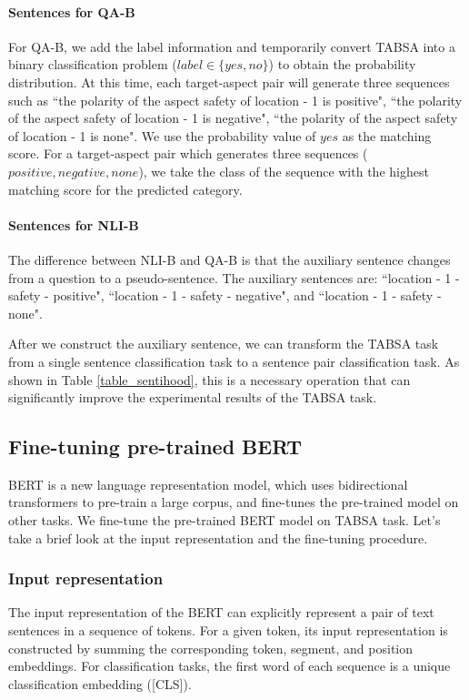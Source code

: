 \documentclass[11pt,a4paper]{article}
\theoremstyle{definition}
\begin{document}
	\paragraph{Sentences for QA-B}
	For QA-B, we add the label information and temporarily convert TABSA into a binary classification problem ($label\in\{yes, no\} $) to obtain the probability distribution. At this time, each target-aspect pair will generate three sequences such as ``the polarity of the aspect safety of location - 1 is positive", ``the polarity of the aspect safety of location - 1 is negative", ``the polarity of the aspect safety of location - 1 is none". We use the probability value of $yes$ as the matching score. For a target-aspect pair which generates three sequences ($positive, negative, none$), we take the class of the sequence with the highest matching score for the predicted category.
	
	\paragraph{Sentences for NLI-B}
	The difference between NLI-B and QA-B is that the auxiliary sentence changes from a question to a pseudo-sentence. The auxiliary sentences are: ``location - 1 - safety - positive", ``location - 1 - safety - negative", and ``location - 1 - safety - none".
	
	After we construct the auxiliary sentence, we can transform the TABSA task from a single sentence classification task to a sentence pair classification task. As shown in Table \ref{table_sentihood}, this is a necessary operation that can significantly improve the experimental results of the TABSA task.
	
	\subsection{Fine-tuning pre-trained BERT}
	BERT \cite{devlin2018bert} is a new language representation model, which uses bidirectional transformers to pre-train a large corpus, and fine-tunes the pre-trained model on other tasks. We fine-tune the pre-trained BERT model on TABSA task. Let's take a brief look at the input representation and the fine-tuning procedure.
	
	\subsubsection{Input representation} The input representation of the BERT can explicitly represent a pair of text sentences in a sequence of tokens. For a given token, its input representation is constructed by summing the corresponding token, segment, and position embeddings. For classification tasks, the first word of each sequence is a unique classification embedding ([CLS]).
	
\end{document}
